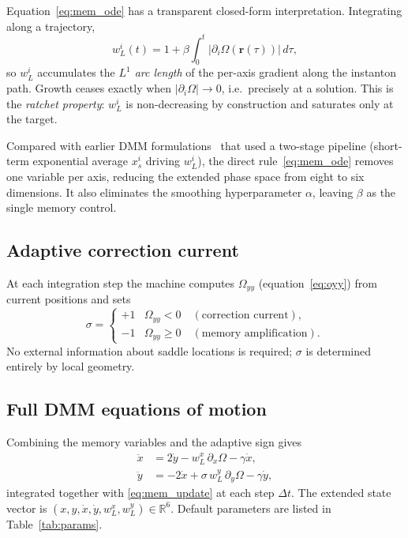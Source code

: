 \documentclass[10pt,twocolumn]{article}
\begin{document}
Equation~\eqref{eq:mem_ode} has a transparent closed-form interpretation.
Integrating along a trajectory,
\begin{equation}
  w_L^i(t) = 1 + \beta\!\int_0^t |\partial_i\Omega(\mathbf{r}(\tau))|\,d\tau,
  \label{eq:mem_integral}
\end{equation}
so $w_L^i$ accumulates the \emph{$L^1$ arc length} of the per-axis gradient
along the instanton path.
Growth ceases exactly when $|\partial_i\Omega|\to0$, i.e.\ precisely at a
solution.
This is the \emph{ratchet property}: $w_L^i$ is non-decreasing by construction
and saturates only at the target.

Compared with earlier DMM formulations~\cite{traversa2015,diventra2018} that
used a two-stage pipeline (short-term exponential average $x_s^i$ driving
$w_L^i$), the direct rule~\eqref{eq:mem_ode} removes one variable per axis,
reducing the extended phase space from eight to six dimensions.
It also eliminates the smoothing hyperparameter $\alpha$, leaving $\beta$ as
the single memory control.

\subsection{Adaptive correction current}

At each integration step the machine computes $\Omega_{yy}$
(equation~\eqref{eq:oyy}) from current positions and sets
\begin{equation}
  \sigma =
  \begin{cases}
    +1 & \Omega_{yy}<0 \quad(\text{correction current}),\\
    -1 & \Omega_{yy}\geq0 \quad(\text{memory amplification}).
  \end{cases}
  \label{eq:sigma}
\end{equation}
No external information about saddle locations is required;
$\sigma$ is determined entirely by local geometry.

\subsection{Full DMM equations of motion}

Combining the memory variables and the adaptive sign gives
\begin{align}
  \ddot{x} &=  2\dot{y}
               - w_L^x\,\partial_x\Omega
               - \gamma\dot{x},
  \label{eq:dmm_x}\\
  \ddot{y} &= -2\dot{x}
               + \sigma\,w_L^y\,\partial_y\Omega
               - \gamma\dot{y},
  \label{eq:dmm_y}
\end{align}
integrated together with \eqref{eq:mem_update} at each step $\Delta t$.
The extended state vector is $(x, y, \dot{x}, \dot{y}, w_L^x, w_L^y)\in\mathbb{R}^6$.
Default parameters are listed in Table~\ref{tab:params}.
\end{document}
